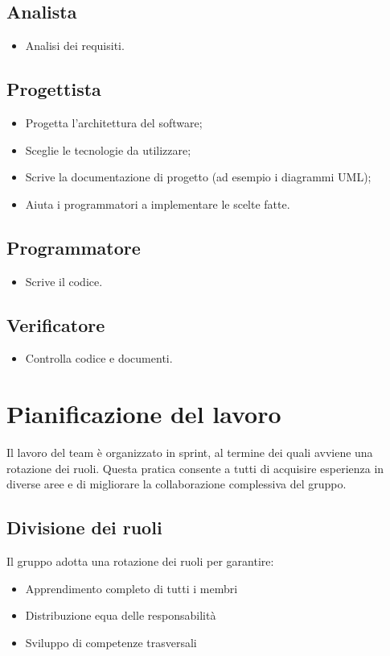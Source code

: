 \documentclass[11pt,a4paper]{article}
\begin{document}
\subsection{Analista}
\begin{itemize}
    \item Analisi dei requisiti.
\end{itemize}

\subsection{Progettista}
\begin{itemize}
    \item Progetta l’architettura del software;
    \item Sceglie le tecnologie da utilizzare;
    \item Scrive la documentazione di progetto (ad esempio i diagrammi UML);
    \item Aiuta i programmatori a implementare le scelte fatte.
\end{itemize}

\subsection{Programmatore}
\begin{itemize}
    \item Scrive il codice.
\end{itemize}

\subsection{Verificatore}
\begin{itemize}
    \item Controlla codice e documenti.
\end{itemize}

\newpage

\section{Pianificazione del lavoro}
Il lavoro del team è organizzato in sprint, al termine dei quali avviene una rotazione dei ruoli. Questa pratica consente a tutti di acquisire esperienza in diverse aree e di migliorare la collaborazione complessiva del gruppo.

\subsection{Divisione dei ruoli}
Il gruppo adotta una rotazione dei ruoli per garantire:
\begin{itemize}
    \item Apprendimento completo di tutti i membri
    \item Distribuzione equa delle responsabilità
    \item Sviluppo di competenze trasversali
\end{itemize}
\end{document}
